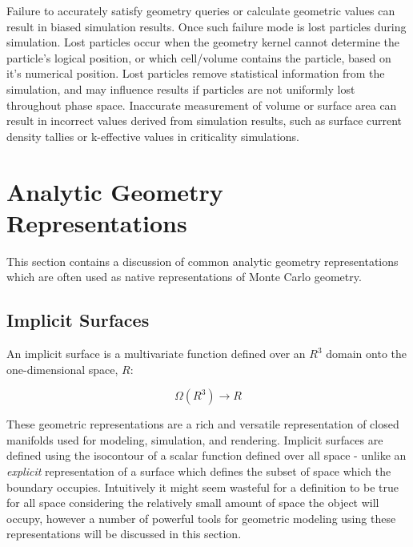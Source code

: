 

Failure to accurately satisfy geometry queries or calculate geometric values can
result in biased simulation results. Once such failure mode is lost particles
during simulation. Lost particles occur when the geometry kernel cannot
determine the particle's logical position, or which cell/volume contains the
particle, based on it's numerical position. Lost particles remove statistical
information from the simulation, and may influence results if particles are not
uniformly lost throughout phase space. Inaccurate measurement of volume or
surface area can result in incorrect values derived from simulation results,
such as surface current density tallies or k-effective values in criticality
simulations.

\section{Analytic Geometry Representations}\label{sec:analytic_geometry}

This section contains a discussion of common analytic geometry  representations
which are often used as native representations of Monte Carlo geometry.

\subsection{Implicit Surfaces}\label{subsec:implicit_surfaces}

An implicit surface is a multivariate function defined over an $ R^3 $ domain
onto the one-dimensional space, $ R $:

\begin{equation}
    \Omega(R^3)\rightarrow R
\end{equation}

These geometric representations are a rich and versatile representation of
closed manifolds used for modeling, simulation, and rendering. Implicit surfaces
are defined using the isocontour of a scalar function defined over all space -
unlike an \textit{explicit} representation of a surface which defines the subset
of space which the boundary occupies. Intuitively it might seem wasteful for a
definition to be true for all space considering the relatively small amount of
space the object will occupy, however a number of powerful tools for geometric
modeling using these representations will be discussed in this section.

